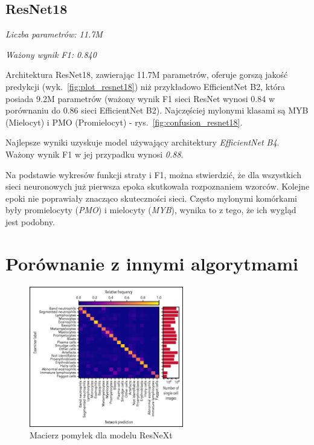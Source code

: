\subsection{ResNet18}
\textit{Liczba parametrów: 11.7M}

\textit{Ważony wynik F1: 0.840}

Architektura ResNet18, zawierając 11.7M parametrów, oferuje gorszą jakość predykcji (wyk.~\ref{fig:plot_resnet18}) niż przykładowo EfficientNet B2, która posiada 9.2M parametrów (ważony wynik F1 sieci ResNet wynosi 0.84 w porównaniu do 0.86 sieci EfficientNet B2).
Najczęściej mylonymi klasami są MYB (Mielocyt) i PMO (Promielocyt) - rys.~\ref{fig:confusion_resnet18}.

\newline
\newline
\newline

Najlepsze wyniki uzyskuje model używający architektury \textit{EfficientNet B4}.
Ważony wynik F1 w jej przypadku wynosi \textit{0.88}.

Na podstawie wykresów funkcji straty i F1, można stwierdzić, że dla wszystkich sieci neuronowych już pierwsza epoka skutkowała rozpoznaniem wzorców.
Kolejne epoki nie poprawiały znacząco skuteczności sieci.
Często mylonymi komórkami były promielocyty (\textit{PMO}) i mielocyty (\textit{MYB}), wynika to z tego, że ich wygląd jest podobny.


\section{Porównanie z innymi algorytmami}

\begin{figure}
    \centering
    \includegraphics[width=0.6\textwidth]{resnext_confusion_matrix}
    \caption{Macierz pomyłek dla modelu ResNeXt \cite{resnext}}
    \label{fig:resnext_confusion_matrix}
\end{figure}

